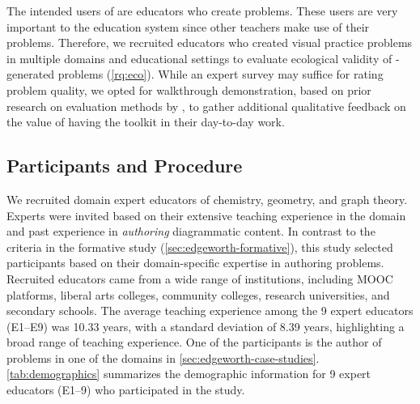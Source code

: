 The intended users of \Edgeworth are educators who create problems. These users are very important to the education system since other teachers make use of their problems. Therefore, we recruited educators who created visual practice problems in multiple domains and educational settings to evaluate ecological validity of \Edgeworth-generated problems (\ref{rq:eco}). While an expert survey may suffice for rating problem quality, we opted for walkthrough demonstration, based on prior research on evaluation methods by \citet{Ledo2018EvaluationResearch}, to gather additional qualitative feedback on the value of having the toolkit in their day-to-day work.

\subsection{Participants and Procedure}
\label{sec:expert-procedure}

We recruited domain expert educators of chemistry, geometry, and graph theory. Experts were invited based on their extensive teaching experience in the domain and past experience in \emph{authoring} diagrammatic content. In contrast to the criteria in the formative study (\cref{sec:edgeworth-formative}), this study selected participants based on their domain-specific expertise in authoring problems. Recruited educators came from a wide range of institutions, including MOOC platforms, liberal arts colleges, community colleges, research universities, and secondary schools. The average teaching experience among the 9 expert educators (E1–E9) was 10.33 years, with a standard deviation of 8.39 years, highlighting a broad range of teaching experience. One of the participants is the author of problems in one of the domains in \cref{sec:edgeworth-case-studies}.
\cref{tab:demographics} summarizes the demographic information for 9 expert educators (E1--9) who participated in the study. 

